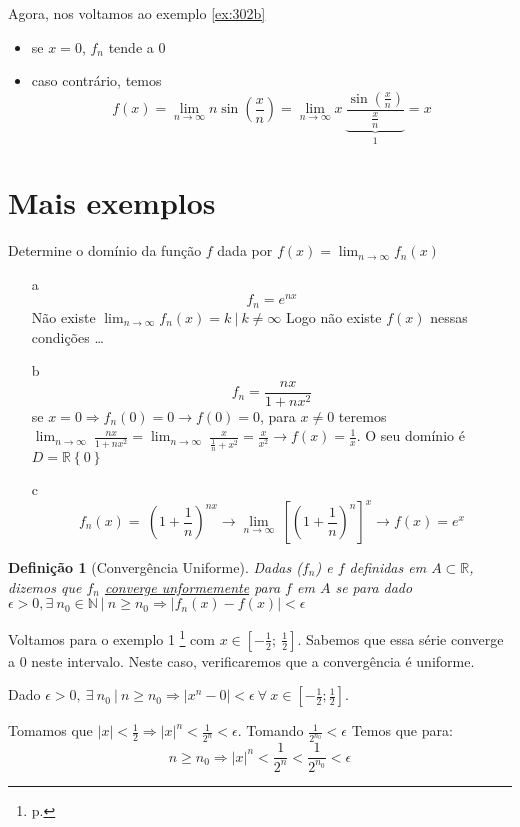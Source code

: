 \documentclass[12pt,openany, letterpaper]{book}
\newtheorem{definition}{Definição}[section]
\newcommand{\LI}[1][n]{\lim_{{#1} \rightarrow \infty}}
\begin{document}
Agora, nos voltamos ao exemplo \ref{ex:302b}
\begin{itemize}
\item se $x=0$, $f_n$ tende a 0
\item caso contrário, temos $$f(x) = \lim_{n \rightarrow \infty} n \sin \left(\frac{x}{n}\right) = \LI x \ \underbrace{\frac{\sin(\frac{x}{n})}{\frac{x}{n}}}_1 = x$$
\end{itemize}

\section*{Mais exemplos} Determine o domínio da função $f$ dada por $\displaystyle{f(x) = \LI f_n(x)}$

\begin{itemize}
\item [a] $$f_n= e^{nx}$$ 
 Não existe $\displaystyle{ \LI f_n(x) = k \ | \ k \neq \infty}$ Logo não existe $f(x)$ nessas condições \ldots
 \item [b] $$f_n= \frac{nx}{1+nx^2}$$
 se $x=0 \Rightarrow f_n(0) = 0 \rightarrow f(0) = 0$, para $x \neq 0$ teremos $\displaystyle{\LI \ \frac{nx}{1+nx^2} = \LI \ \frac{x}{\frac{1}{n}+x^2} = \frac{x}{x^2} \rightarrow f(x) = \frac{1}{x}}$. O seu domínio é $D = \mathds{R} \left\{0\right\}$
 \item [c] $$f_n(x) = \ \left( 1 + \frac{1}{n} \right)^{nx} \rightarrow \LI \ \left[ \left( 1 + \frac{1}{n} \right)^n \right]^x \rightarrow f(x) = e^x$$
\end{itemize}

\begin{definition}[Convergência Uniforme]
Dadas ($f_n$) e $f$ definidas em $A \subset \mathds{R}$, dizemos que $f_n$ \underline{converge unformemente} para $f$ em $A$ se para dado $\epsilon > 0, \exists \ n_0 \in \mathds{N} \ | \ n \geq n_0 \Rightarrow |f_n(x) - f(x)| < \epsilon$
\end{definition}

Voltamos para o exemplo 1 \footnote{p. \pageref{ex:302a}} com $x \in [-\frac{1}{2}; \ \frac{1}{2}]$. Sabemos que essa série converge a 0 neste intervalo. Neste caso, verificaremos que a convergência é uniforme.

Dado $\epsilon > 0, \ \exists \ n_0 \ | \ n \geq n_0 \Rightarrow |x^n-0| < \epsilon \ \forall \ x \in [-\frac{1}{2};\frac{1}{2}]$.

Tomamos que $\displaystyle{|x| < \frac{1}{2} \Rightarrow |x|^n < \frac{1}{2^n} <\epsilon}$. Tomando $\displaystyle{\frac{1}{2^{n_0}} < \epsilon}$ Temos  que para: $$n \geq n_0 \Rightarrow |x|^n < \frac{1}{2^n} < \frac{1}{2^{n_0}} < \epsilon$$
\end{document}
